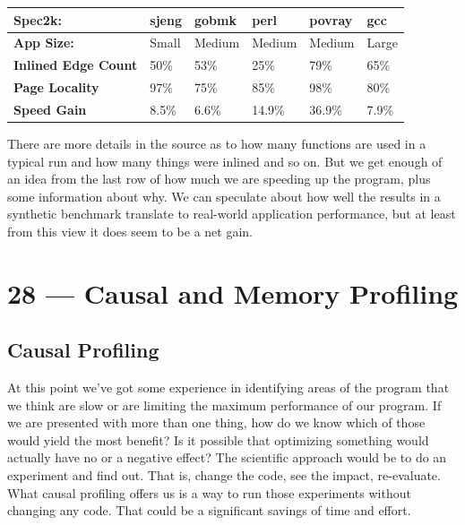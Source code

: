 \documentclass[a4paper]{report}
\begin{document}
\begin{center}
\begin{tabular}{l|l|l|l|l|l}
	\textbf{Spec2k:} & \textbf{sjeng} & \textbf{gobmk} & \textbf{perl} & \textbf{povray} & \textbf{gcc}\\ \hline
	\textbf{App Size:} &  {Small} & {Medium} & {Medium} & {Medium} & {Large} \\ \hline
	\textbf{Inlined Edge Count} & 50\% & 53\% & 25\% & 79\% & 65\% \\ \hline
	\textbf{Page Locality} & 97\% & 75\% & 85\% & 98\% & 80\% \\ \hline
	\textbf{Speed Gain} & 8.5\% & 6.6\% & 14.9\% & 36.9\% & 7.9\% \\ 
\end{tabular}
\end{center}

There are more details in the source as to how many functions are used in a typical run and how many things were inlined and so on. But we get enough of an idea from the last row of how much we are speeding up the program, plus some information about why. We can speculate about how well the results in a synthetic benchmark translate to real-world application performance, but at least from this view it does seem to be a net gain.











\chapter*{28 --- Causal and Memory Profiling}


\section*{Causal Profiling}
At this point we've got some experience in identifying areas of the program that we think are slow or are limiting the maximum performance of our program. If we are presented with more than one thing, how do we know which of those would yield the most benefit? Is it possible that optimizing something would actually have no or a negative effect? The scientific approach would be to do an experiment and find out. That is, change the code, see the impact, re-evaluate. What causal profiling offers us is a way to run those experiments without changing any code. That could be a significant savings of time and effort. 
\end{document}
